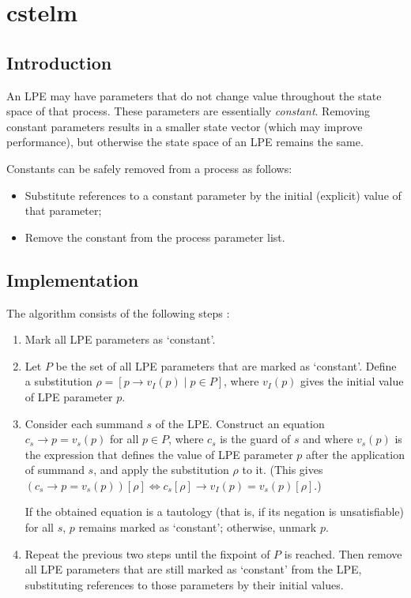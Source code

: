\chapter{cstelm}

\section{Introduction}

An LPE may have parameters that do not change value throughout the state space of that process.
These parameters are essentially \emph{constant}.
Removing constant parameters results in a smaller state vector (which may improve performance), but otherwise the state space of an LPE remains the same.

Constants can be safely removed from a process as follows:
\begin{itemize}
\item Substitute references to a constant parameter by the initial (explicit) value of that parameter;
\item Remove the constant from the process parameter list.
\end{itemize}

\section{Implementation}

The algorithm consists of the following steps \cite{groote2001computer}:

\begin{enumerate}

\item Mark all LPE parameters as `constant'.

\item Let $P$ be the set of all LPE parameters that are marked as `constant'.
Define a substitution $\rho = [p \rightarrow v_I(p) \;|\; p \in P]$, where $v_I(p)$ gives the initial value of LPE parameter $p$.

\item Consider each summand $s$ of the LPE.
Construct an equation $c_s \rightarrow p = v_s(p)$ for all $p \in P$, where $c_s$ is the guard of $s$ and where $v_s(p)$ is the expression that defines the value of LPE parameter $p$ after the application of summand $s$, and apply the substitution $\rho$ to it.
(This gives $(c_s \rightarrow p = v_s(p))[\rho] \Leftrightarrow {c_s}[\rho] \rightarrow v_I(p) = v_s(p)[\rho]$.)

If the obtained equation is a tautology (that is, if its negation is unsatisfiable) for all $s$, $p$ remains marked as `constant'; otherwise, unmark $p$.

\item Repeat the previous two steps until the fixpoint of $P$ is reached.
Then remove all LPE parameters that are still marked as `constant' from the LPE, substituting references to those parameters by their initial values.

\end{enumerate}

